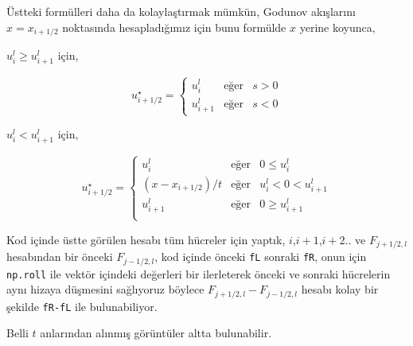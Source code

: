 \documentclass[12pt,fleqn]{article}\usepackage{../../common}
\begin{document}
Üstteki formülleri daha da kolaylaştırmak mümkün, Godunov akışlarını
$x = x_{i+1/2}$ noktasında hesapladığımız için bunu formülde $x$ yerine
koyunca,

$u_i^l \ge u_{i+1}^l$ için,

$$
u^\star_{i+1/2} = 
\left\{ \begin{array}{lll}
u_i^l & \textrm{eğer} & s > 0  \\
u_{i+1}^l & \textrm{eğer} & s < 0
\end{array} \right.
$$

$u_i^l < u_{i+1}^l$ için,

$$
u^\star_{i+1/2} = 
\left\{ \begin{array}{lll}
u_i^l & \textrm{eğer} & 0 \le u_i^l   \\
(x-x_{i+1/2})/t & \textrm{eğer} & u_i^l < 0 < u_{i+1}^l   \\
u_{i+1}^l & \textrm{eğer} & 0 \ge u_{i+1}^l   \\
\end{array} \right.
$$

Kod içinde üstte görülen hesabı tüm hücreler için yaptık, $i$,$i+1$,$i+2$.. ve
$F_{j+1/2,l}$ hesabından bir önceki $F_{j-1/2,l}$, kod içinde önceki \verb!fL!
sonraki \verb!fR!, onun için \verb!np.roll! ile vektör içindeki değerleri bir
ilerleterek önceki ve sonraki hücrelerin aynı hizaya düşmesini sağlıyoruz
böylece $F_{j+1/2,l}-F_{j-1/2,l}$ hesabı kolay bir şekilde \verb!fR-fL!
ile bulunabiliyor.

Belli $t$ anlarından alınmış görüntüler altta bulunabilir.
\end{document}
